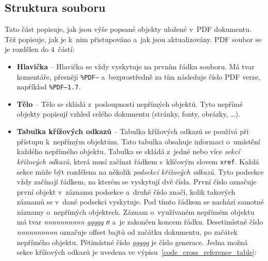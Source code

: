 \subsection*{Struktura souboru}
Tato část popisuje, jak jsou výše popsané objekty uložené v~PDF dokumentu.
Též popisuje, jak je k~nim přistupováno a~jak jsou aktualizovány.
PDF soubor se je rozdělen do 4~částí: 
\begin{itemize}
    \item \textbf{Hlavička} -- Hlavička se vždy vyskytuje na prvním řádku souboru.
    Má tvar komentáře, přesněji \texttt{\%PDF–} a~bezprostředně za tím následuje
    číslo PDF verze, například \texttt{\%PDF–1.7}.
    
    \item \textbf{Tělo} -- Tělo se skládá z~posloupnosti nepřímých objektů. Tyto 
    nepřímé objekty popisují vzhled celého dokumentu (stránky, fonty, obrázky,
    \ldots).
    
    \item \textbf{Tabulka křížových odkazů} -- Tabulka křížových odkazů se používá
    při přístupu k~nepřímým objektům. Tato tabulka obsahuje informaci o~umístění
    každého nepřímého objektu. Tabulka se skládá z~jedné nebo více \emph{sekcí
    křížových odkazů}, která musí začínat řádkem s~klíčovým slovem \texttt{xref}.
    Každá sekce může být rozdělena na několik \emph{podsekcí křížových odkazů}.
    Tyto podsekce vždy začínají řádkem, na kterém se vyskytují dvě čísla. První
    číslo označuje první objekt v~záznamu podsekce a~druhé číslo značí, kolik
    takových záznamů se v~dané podsekci vyskytuje. Pod tímto řádkem se nachází
    samotné záznamy o~nepřímých objektech. Záznam o~využívaném nepřímém objektu
    má tvar \emph{nnnnnnnnnn ggggg \texttt{n}} a~je zakončen koncem řádku.
    Desetimístné číslo \emph{nnnnnnnnnn} označuje offset bajtů od začátku
    dokumentu, po začátek nepřímého objektu. Pětimístné číslo \emph{ggggg} je
    číslo generace. Jedna možná sekce křížových odkazů je uvedena ve 
    výpisu~\ref{code_cross_reference_table}:
    

\end{itemize}
